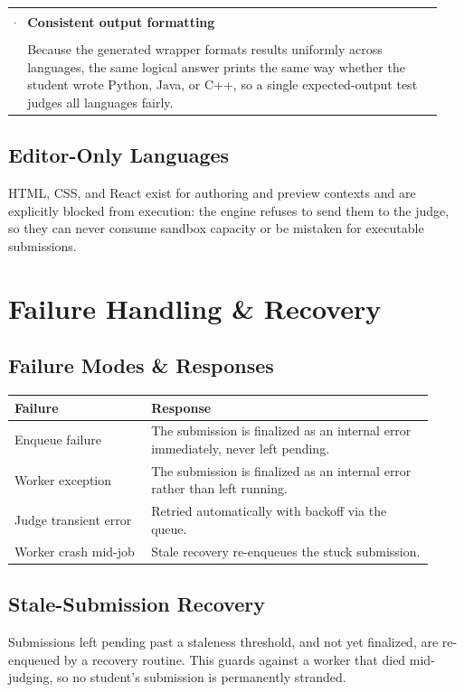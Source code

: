 \documentclass[12pt,a4paper,oneside]{report}
\makeatletter
\newenvironment{callout}[1]{\par\vspace{4pt}\noindent
  \begin{tabular}{@{}p{0.014\linewidth}@{\hspace{0.6em}}p{0.93\linewidth}@{}}
  \textcolor{boxframe}{\rule{2pt}{\baselineskip}} & \textbf{\textcolor{tcetblue}{#1}}\\[2pt] & }{\end{tabular}\par\vspace{6pt}}
\makeatother
\begin{document}
\begin{callout}{Consistent output formatting}
Because the generated wrapper formats results uniformly across languages, the
same logical answer prints the same way whether the student wrote Python, Java,
or C++, so a single expected-output test judges all languages fairly.
\end{callout}

\section{Editor-Only Languages}
HTML, CSS, and React exist for authoring and preview contexts and are explicitly
blocked from execution: the engine refuses to send them to the judge, so they can
never consume sandbox capacity or be mistaken for executable submissions.

\chapter{Failure Handling \& Recovery}
\section{Failure Modes \& Responses}
\begin{longtable}{@{}p{0.30\linewidth} p{0.62\linewidth}@{}}
\toprule
\textbf{Failure} & \textbf{Response}\\
\midrule
\endhead
Enqueue failure & The submission is finalized as an internal error immediately, never left pending.\\
Worker exception & The submission is finalized as an internal error rather than left running.\\
Judge transient error & Retried automatically with backoff via the queue.\\
Worker crash mid-job & Stale recovery re-enqueues the stuck submission.\\
\bottomrule
\end{longtable}

\section{Stale-Submission Recovery}
Submissions left pending past a staleness threshold, and not yet finalized, are
re-enqueued by a recovery routine. This guards against a worker that died
mid-judging, so no student's submission is permanently stranded.
\end{document}
